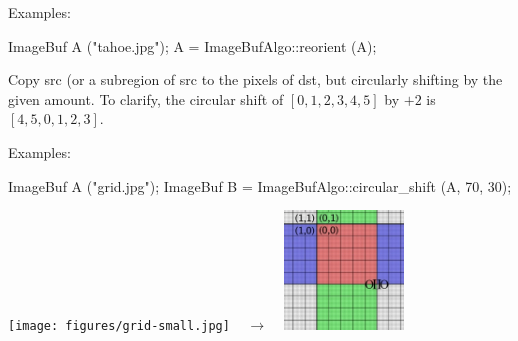 \smallskip
\noindent Examples:
\begin{code}
    ImageBuf A ("tahoe.jpg");
    A = ImageBufAlgo::reorient (A);
\end{code}
\apiend



 

Copy {\cf src} (or a subregion of {\cf src} to the pixels of {\cf dst},
but circularly shifting by the given amount.  To clarify, the circular
shift of $[0,1,2,3,4,5]$ by $+2$ is $[4,5,0,1,2,3]$.

\smallskip
\noindent Examples:
\begin{code}
    ImageBuf A ("grid.jpg");
    ImageBuf B = ImageBufAlgo::circular_shift (A, 70, 30);
\end{code}
\spc \texttt{[image: figures/grid-small.jpg]} 
~ {\Huge $\rightarrow$} ~
\includegraphics[width=1.25in]{figures/cshift.jpg} \\
\apiend


